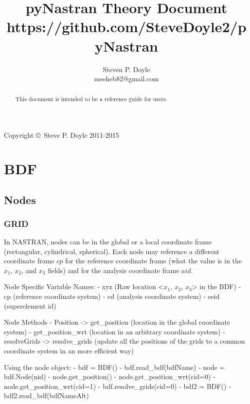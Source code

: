 
\title{pyNastran Theory Document \\
\small https://github.com/SteveDoyle2/pyNastran }
\author{Steven P. Doyle\\
{\small mesheb82@gmail.com}
}

\maketitle

\begin{abstract}
This document is intended to be a reference guide for users.
\end{abstract}

Copyright \copyright\ Steve P. Doyle 2011-2015
\newpage

\tableofcontents
\newpage

\section{BDF}

 \subsection{Nodes}
  \subsubsection{GRID}
     In NASTRAN, nodes can be in the global or a local coordinate
     frame (rectangular, cylindrical, spherical).  Each node may reference
     a different coordinate frame $cp$ for the reference coordinate frame
     (what the value is in the $x_1$, $x_2$, and $x_3$ fields) and for the
     analysis coordinate frame $aid$.
     
     Node Specific Variable Names:
      - xyz (Raw location <$x_1$, $x_2$, $x_3$> in the BDF)
      - cp (reference coordinate system)
      - cd (analysis  coordinate system)
      - seid (superelement id)

     Node Methods
      - Position -> get_position (location in the global coordinate system)
      - get_position_wrt  (location in an arbitrary coordinate system)
      - resolveGrids -> resolve_grids (update all the positions of the grids to a common coordinate system in an more efficient way)

     Using the node object:
      - bdf = BDF()
      - bdf.read_bdf(bdfName)
      - node = bdf.Node(nid)
      - node.get_position()            %
      - node.get_position_wrt(cid=0)   %
      - node.get_position_wrt(cid=1)   %
      - bdf.resolve_grids(cid=0) %
      - bdf2 = BDF()
      - bdf2.read_bdf(bdfNameAlt)

